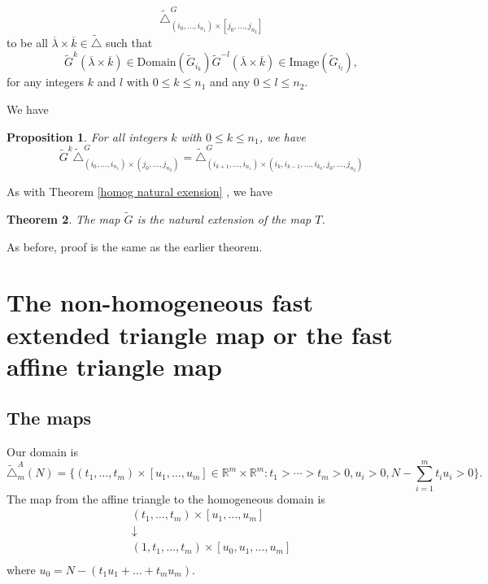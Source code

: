 \documentclass[12pt,oneside,openany]{article}
\newtheorem{theorem}{Theorem}[section]
\newtheorem{prop}[theorem]{Proposition}
\def\R{{\mathbb R}} %
\begin{document}
$$\tilde{\triangle}_{ (i_0, \ldots, i_{n_1})\times [j_0, \ldots, j_{n_2}]   }^G  $$
to be all $\overline{\lambda} \times \overline{k} \in \tilde{\triangle}$ such that 
$$   \tilde{G}^k(\overline{\lambda} \times \overline{k}) \in  \mbox{Domain}(\tilde{G}_{i_k})   \tilde{G}^{-l}(\overline{\lambda} \times \overline{k}) \in   \mbox{Image}(\tilde{G}_{i_l}),$$
for any  integers $k$ and $l$ with $0\leq k \leq n_1$ and any $0\leq l \leq n_2.$

We have 

\begin{prop} For all integers  $k$ with $0\leq k \leq n_1$, we have 
$$\tilde{G}^{k}\tilde{\triangle}_{  (i_0, \ldots, i_{n_1})\times (j_0, \ldots, j_{n_2})   }^G =   \tilde{\triangle}_{ (i_{k+1},  \ldots, i_{n_1}) \times  (i_k, i_{k-1}, \ldots, i_{k_0}, j_0, \ldots, j_{n_2} ) }^G  $$
\end{prop}


 As with Theorem \ref{homog natural exension} , we have 
 \begin{theorem}   The map $\tilde{G}$ is the natural extension of the map $T$.



\end{theorem}
 As before,  proof is the same as the earlier theorem.




\section{The non-homogeneous fast extended triangle map or the fast affine triangle map}\label{nonhomogeneous fast case}

\subsection{The maps}

Our domain is 
$$ \tilde{\triangle}_m^A(N) = \{ (t_1, \ldots, t_m)\times [u_1, \ldots, u_m]\in \R^m\times \R^m: t_1 > \cdots > t_m>0, u_i>0,  N- \sum_{i=1}^m t_i u_i >0\}.$$
The map from the affine triangle to the homogeneous domain is 
$$\begin{array}{c}
(t_1, \ldots, t_m) \times [u_1, \ldots, u_m]\\
\downarrow  \\

(1, t_1, \ldots, t_m) \times [u_0, u_1, \ldots, u_m] \\
  \end{array}$$
where $u_0 = N- ( t_1 u_1 + \ldots + t_m u_m).
$
\end{document}

